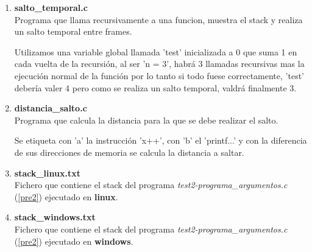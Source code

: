 \documentclass[12pt,a4paper,titlepage]{article}
\begin{document}
\begin{enumerate}
  \item \textbf{salto\_temporal.c} \label{pre4} 
  \\
Programa que llama recursivamente a una funcion, muestra el stack y realiza un salto
temporal entre frames.

Utilizamos una variable global llamada 'test' inicializada a 0 que suma 1 en cada vuelta
de la recursión, al ser 'n = 3', habrá 3 llamadas recursivas mas la ejecución normal de
la función por lo tanto si todo fuese correctamente, 'test' debería valer 4 pero como
se realiza un salto temporal, valdrá finalmente 3.


  \item \textbf{distancia\_salto.c} \label{pre5} 
  \\
Programa que calcula la distancia para la que se debe realizar el salto.

Se etiqueta con 'a' la instrucción 'x++', con 'b' el 'printf...' y con la diferencia de
sus direcciones de memoria se calcula la distancia a saltar.


\item \textbf{stack\_linux.txt} \label{pre6} 
  \\
  Fichero que contiene el stack del programa \emph{test2-programa\_argumentos.c}
(\ref{pre2}) ejecutado en \textbf{linux}.


  \item \textbf{stack\_windows.txt} \label{pre7} 
  \\
  Fichero que contiene el stack del programa \emph{test2-programa\_argumentos.c}
(\ref{pre2}) ejecutado en \textbf{windows}.
  
  \end{enumerate}
\end{document}
